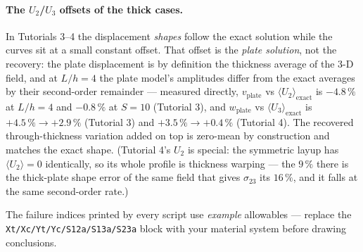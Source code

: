 \documentclass[11pt]{article}
\newcommand{\code}[1]{\texttt{#1}}
\begin{document}
\paragraph{The $U_2$/$U_3$ offsets of the thick cases.}
In Tutorials 3--4 the displacement \emph{shapes} follow the exact
solution while the curves sit at a small constant offset.  That offset
is the \emph{plate solution}, not the recovery: the plate displacement
is by definition the thickness average of the 3-D field, and at
$L/h{=}4$ the plate model's amplitudes differ from the exact averages
by their second-order remainder --- measured directly,
$v_{\text{plate}}$ vs $\langle U_2\rangle_{\text{exact}}$ is $-4.8\,\%$
at $L/h{=}4$ and $-0.8\,\%$ at $S{=}10$ (Tutorial 3), and
$w_{\text{plate}}$ vs $\langle U_3\rangle_{\text{exact}}$ is
$+4.5\,\%\rightarrow+2.9\,\%$ (Tutorial 3) and
$+3.5\,\%\rightarrow+0.4\,\%$ (Tutorial 4).  The recovered
through-thickness variation added on top is zero-mean by construction
and matches the exact shape.  (Tutorial 4's $U_2$ is special: the
symmetric layup has $\langle U_2\rangle=0$ identically, so its whole
profile is thickness warping --- the $9\,\%$ there is the thick-plate
shape error of the same field that gives $\sigma_{23}$ its $16\,\%$,
and it falls at the same second-order rate.)

The failure indices printed by every script use \emph{example}
allowables --- replace the \code{Xt/Xc/Yt/Yc/S12a/S13a/S23a} block with
your material system before drawing conclusions.
\end{document}
